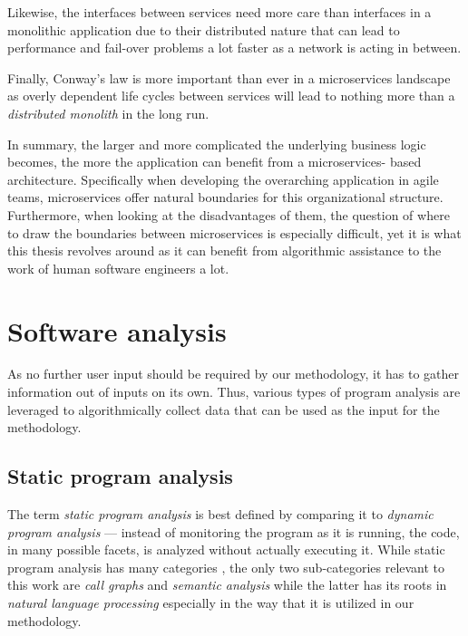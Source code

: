 \documentclass[12pt,a4paper]{report}
\begin{document}
Likewise, the interfaces between services need more care than interfaces in a
monolithic application due to their distributed nature that can lead to
performance and fail-over problems a lot faster as a network is acting in
between.

Finally, Conway's law \cite{conway1968law} is more important than ever in a
microservices landscape as overly dependent life cycles between services will
lead to nothing more than a \textit{distributed monolith} in the long run.
\newline

\noindent In summary, the larger and more complicated the underlying business
logic becomes, the more the application can benefit from a microservices\hyp
based architecture. Specifically when developing the overarching application in
agile teams, microservices offer natural boundaries for this organizational
structure. Furthermore, when looking at the disadvantages of them, the question
of where to draw the boundaries between microservices is especially difficult,
yet it is what this thesis revolves around as it can benefit from algorithmic
assistance to the work of human software engineers a lot.

\section{Software analysis} \label{sect:background-program-analysis}

As no further user input should be required by our methodology, it has to
gather information out of inputs on its own. Thus, various types of program
analysis are leveraged to algorithmically collect data that can be used as the
input for the methodology.


\subsection{Static program analysis}

The term \textit{static program analysis} is best defined by comparing it to
\textit{dynamic program analysis} --- instead of monitoring the program as it
is running, the code, in many possible facets, is analyzed without actually
executing it. While static program analysis has many categories \cite{
woegerer2005static}, the only two sub-categories relevant to this work are
\textit{call graphs} and \textit{semantic analysis} while the latter has its
roots in \textit{natural language processing} especially in the way that it is
utilized in our methodology.
\end{document}
